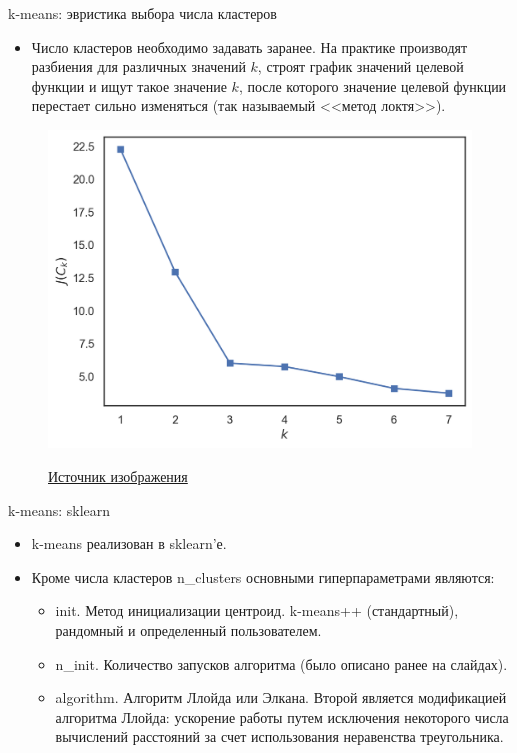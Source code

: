 \documentclass{beamer}
\begin{document}
\begin{frame}{k-means: эвристика выбора числа кластеров}
    \small
    
    \begin{itemize}
        \item Число кластеров необходимо задавать заранее. На практике производят разбиения для различных значений $k$, строят график значений целевой функции и ищут такое значение $k$, после которого значение целевой функции перестает сильно изменяться (так называемый <<метод локтя>>).
    \end{itemize}
    
    \begin{figure}
        \centering
        \includegraphics[width=0.6\linewidth]{elbow_method.png}
        
        \href{https://mlcourse.ai/book/topic07/topic7_pca_clustering.html
}{Источник изображения}
    \end{figure}
\end{frame}

\begin{frame}{k-means: sklearn}
    \small

    \begin{itemize}
        \item k-means реализован в sklearn'е.
        \item Кроме числа кластеров n\_clusters основными гиперпараметрами являются:
        \begin{itemize}
            \item init. Метод инициализации центроид. k-means++ (стандартный), рандомный и определенный пользователем.
            \item n\_init. Количество запусков алгоритма (было описано ранее на слайдах).
            \item algorithm. Алгоритм Ллойда или Элкана. Второй является модификацией алгоритма Ллойда: ускорение работы путем исключения некоторого числа вычислений расстояний за счет использования неравенства треугольника.
        \end{itemize}       
    \end{itemize}
\end{frame}
\end{document}

